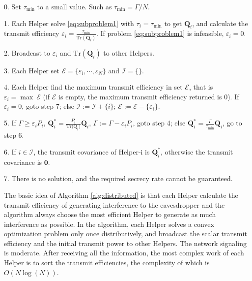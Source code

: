 \documentclass[conference]{IEEEtran}
\begin{document}
\begin{algorithm}
	\caption{}\label{alg:distributed}
	\begin{algorithmic}
		\item[0.] Set $\tau_{\mathrm{min}}$ to a small value. Such as $\tau_{\mathrm{min}} = \Gamma/N$. 
		\item[1.] Each Helper solve \eqref{eq:subproblem1} with $\tau_i = \tau_{\mathrm{min}}$ to get $\mathbf{Q}_i$, and calculate the transmit efficiency $\varepsilon_i = \frac{\tau_{\mathrm{min}}}{\mathrm{Tr}(\mathbf{Q}_i)}$. If problem \eqref{eq:subproblem1} is infeasible, $\varepsilon_i = 0$.
		\item[2.] Broadcast to $\varepsilon_i$ and $\mathrm{Tr}(\mathbf{Q}_i)$ to other Helpers. 
		\item[3.] Each Helper set $\mathcal{E} =\{ {\varepsilon_i,\cdots, \varepsilon_N}\}$ and $\mathcal{I} =\{\}$.
		\item[4.] Each Helper find the maximum transmit efficiency in set $\mathcal{E}$, that is $\varepsilon_i = \max~\mathcal{E}$ (if $\mathcal{E}$ is empty,  the maximum transmit efficiency returned is 0). If $\varepsilon_i = 0$, goto step 7; else $\mathcal{I} := \mathcal{I} + \{i\}$; $\mathcal{E} := \mathcal{E}  - \{\varepsilon_i\}$.
		\item[5.] If $\Gamma \geq \varepsilon_{i} P_i$, $\mathbf{Q}_{i}^* = \frac{P_i}{\mathrm{Tr(\mathrm{Q}}_i)}\mathbf{Q}_i$, $\Gamma := \Gamma - \varepsilon_iP_i$, goto step 4; else $\mathbf{Q}_{i}^* = \frac{\Gamma}{\tau_\mathrm{min}}\mathbf{Q}_i$, go to step 6.
		\item[6.] If $i \in \mathcal{I}$, the transmit covariance of Helper-i is $\mathbf{Q}_i^*$, otherwise the transmit covariance is $\mathbf{0}$.
		\item[7.] There is no solution,  and the required secrecy rate cannot be guaranteed.
	\end{algorithmic}
\end{algorithm}

The basic idea of Algorithm \ref{alg:distributed} is that each Helper calculate the transmit efficiency of generating interference to the eavesdropper and the algorithm always choose the most efficient Helper to generate as much interference as possible. In the algorithm, each Helper solves a convex optimization problem only once distributively, and broadcast the scalar transmit efficiency and the initial transmit power to other Helpers. The network signaling is moderate. After receiving all the information, the most complex work of each Helper is to sort the transmit efficiencies, the complexity of which is $O(N\log(N))$. 
\end{document}
